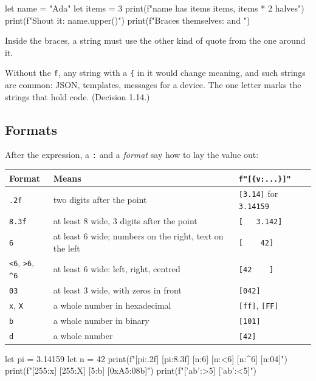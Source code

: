 \begin{zeno}
let name = "Ada"
let items = 3
print(f"{name} has {items} items, {items * 2} halves")
print(f"Shout it: {name.upper()}")
print(f"Braces themselves: {{ and }}")
\end{zeno}

Inside the braces, a string must use the other kind of quote from the
one around it.

\begin{why}
Without the \verb|f|, any string with a \verb|{| in it would change
meaning, and such strings are common: JSON, templates, messages for a
device. The one letter marks the strings that hold code.
(Decision 1.14.)
\end{why}

\subsection{Formats}

After the expression, a \verb|:| and a \emph{format} say how to lay the
value out:

\begin{center}
\begin{tabular}{lll}
\toprule
Format & Means & \verb|f"[{v:...}]"| \\
\midrule
\verb|.2f| & two digits after the point & \verb|[3.14]| for \verb|3.14159| \\
\verb|8.3f| & at least 8 wide, 3 digits after the point & \verb|[   3.142]| \\
\verb|6| & at least 6 wide; numbers on the right, text on the left & \verb|[    42]| \\
\verb|<6|, \verb|>6|, \verb|^6| & at least 6 wide: left, right, centred & \verb|[42    ]| \\
\verb|03| & at least 3 wide, with zeros in front & \verb|[042]| \\
\verb|x|, \verb|X| & a whole number in hexadecimal & \verb|[ff]|, \verb|[FF]| \\
\verb|b| & a whole number in binary & \verb|[101]| \\
\verb|d| & a whole number & \verb|[42]| \\
\bottomrule
\end{tabular}
\end{center}

\begin{zeno}
let pi = 3.14159
let n = 42
print(f"[{pi:.2f}] [{pi:8.3f}] [{n:6}] [{n:<6}] [{n:^6}] [{n:04}]")
print(f"[{255:x}] [{255:X}] [{5:b}] [{0xA5:08b}]")
print(f"[{'ab':>5}] [{'ab':<5}]")
\end{zeno}

